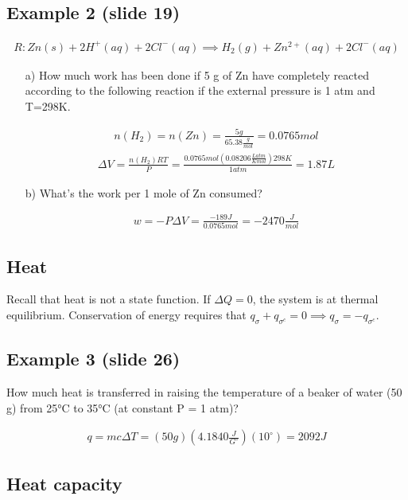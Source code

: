 \documentclass[12pt]{article}
\begin{document}
\subsection*{Example 2 (slide 19)}
\begin{align*}
    R:Zn(s)+2H^+(aq)+2Cl^-(aq)\implies H_2(g)+Zn^{2+}(aq)+2Cl^-(aq)
\end{align*}
\begin{itemize}
    \item[a)]  How much work has been done if 5 g of Zn have completely reacted according
    to the following reaction if the external pressure is 1 atm and T=298K.

    \begin{align*}
        n(H_2)=n(Zn)=\frac{5g}{65.38\frac{g}{mol}}=0.0765mol
    \end{align*}
    \begin{align*}
        \Delta V=\frac{n(H_2)RT}{P}=\frac{0.0765mol(0.08206\frac{Latm}{Kmol})298K}{1atm}=1.87L
    \end{align*}

    \item[b)] What’s the work per 1 mole of Zn consumed?
    
    \begin{align*}
        w=-P\Delta V=\frac{-189J}{0.0765mol}=-2470\frac{J}{mol}
    \end{align*}
\end{itemize}

\subsection*{Heat}
Recall that heat is not a state function. If $\Delta Q=0$, the system is at thermal equilibrium. Conservation of energy requires that $q_{\sigma}+q_{\sigma^c}=0\implies q_{\sigma}=-q_{\sigma^c}$.

\subsection*{Example 3 (slide 26)}

How much heat is transferred in raising the temperature of a beaker of water (50 g) from 25°C to 35°C (at constant P = 1 atm)?

\begin{align*}
    q=mc\Delta T=(50g)(4.1840\frac{J}{G^{\circ}})(10^{\circ})=2092J
\end{align*}

\subsection*{Heat capacity}
\end{document}
